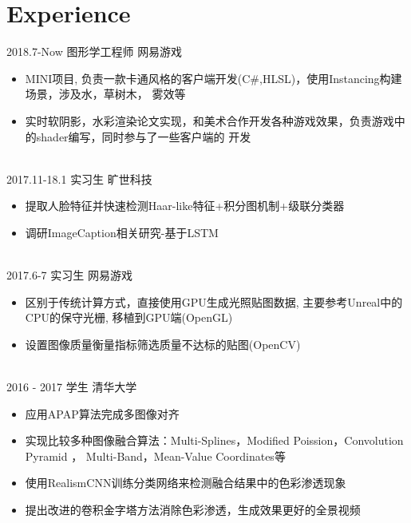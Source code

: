 \documentclass[]{cv-style} %
\begin{document}
\section{Experience}
\begin{entrylist}

\entry
  {2018.7-Now}
  {图形学工程师}
  {网易游戏}
  {
    \leftmargini=-1cm
    \begin{itemize}
      \setlength{\itemsep}{3pt}
      \item {MINI项目, 负责一款卡通风格的客户端开发(C\#,HLSL)，使用Instancing构建\\场景，涉及水，草树木，
      雾效等}
      \item {实时软阴影，水彩渲染论文实现，和美术合作开发各种游戏效果，负责游戏中\\的shader编写，同时参与了一些客户端的
      开发}
    \end{itemize}
  }
  \\

\entry
  {2017.11-18.1}
  {实习生}
  {旷世科技}
  {
    \leftmargini=-1cm
    \begin{itemize}
      \setlength{\itemsep}{3pt}
      \item {提取人脸特征并快速检测Haar-like特征+积分图机制+级联分类器}
      \item {调研ImageCaption相关研究-基于LSTM}
    \end{itemize}
  }
    \\

\entry
  {2017.6-7}
  {实习生}
  {网易游戏}
  {
    \leftmargini=-1cm
    \begin{itemize}
      \setlength{\itemsep}{3pt}
      \item {区别于传统计算方式，直接使用GPU生成光照贴图数据, 主要参考Unreal中的\\CPU的保守光栅, 移植到GPU端(OpenGL)}
      \item {设置图像质量衡量指标筛选质量不达标的贴图(OpenCV)}
    \end{itemize}
  }
    \\

\entry
  {2016 - 2017}
  {学生}
  {清华大学}
  {
    \leftmargini=-1cm
    \begin{itemize}
      \setlength{\itemsep}{3pt}
      \item {应用APAP算法完成多图像对齐}
      \item {实现比较多种图像融合算法：Multi-Splines，Modified Poission，Convolution\\ Pyramid
      ， Multi-Band，Mean-Value Coordinates等}
      \item {使用RealismCNN训练分类网络来检测融合结果中的色彩渗透现象}
      \item {提出改进的卷积金字塔方法消除色彩渗透，生成效果更好的全景视频}
    \end{itemize}
  }

\end{entrylist}
\end{document}
